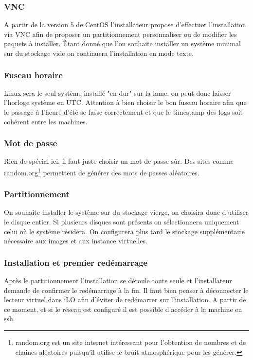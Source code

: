 \documentclass[a4paper,oneside]{report}
\begin{document}
\subsubsection{VNC}
A partir de la version 5 de CentOS l'installateur propose d'effectuer l'installation via VNC afin de proposer un partitionnement personnaliser ou de modifier les paquets à installer.
Étant donné que l'on souhaite installer un système minimal sur du stockage vide on continuera l'installation en mode texte.

\subsubsection{Fuseau horaire}
Linux sera le seul système installé "en dur" sur la lame, on peut donc laisser l'horloge système en UTC.
Attention à bien choisir le bon fuseau horaire afin que le passage à l'heure d'été se fasse correctement et que le timestamp des logs soit cohérent entre les machines.

\subsubsection{Mot de passe}
Rien de spécial ici, il faut juste choisir un mot de passe sûr. Des sites comme random.org\footnote{random.org est un site internet intéressant pour l'obtention de nombres et de chaines aléatoires puisqu'il utilise le bruit atmosphérique pour les générer.} permettent de générer des mots de passes aléatoires.

\subsubsection{Partitionnement}
On souhaite installer le système sur du stockage vierge, on choisira donc d'utiliser le disque entier.
Si plusieurs disques sont présents on sélectionnera uniquement celui où le système résidera.
On configurera plus tard le stockage supplémentaire nécessaire aux images et aux instance virtuelles.

\subsubsection{Installation et premier redémarrage}
Après le partitionnement l'installation se déroule toute seule et l'installateur demande de confirmer le redémarrage à la fin.
Il faut bien penser à déconnecter le lecteur virtuel dans iLO afin d'éviter de redémarrer sur l'installation.\newline
A partir de ce moment, et si le réseau est configuré il est possible d'accéder à la machine en \gls{ssh}.
\end{document}
